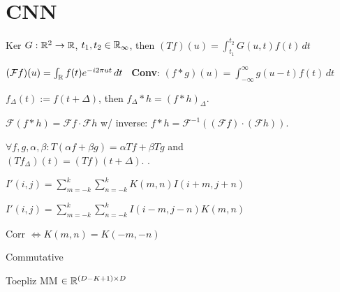 \section{CNN}

\begin{definition}[Integral Op]
    Ker \(G: \mathbb{R}^2 \to \mathbb{R}\), \(t_1, t_2 \in \mathbb{R}_\infty\), then
    \((T f)(u) = \int_{t_1}^{t_2} G(u, t) f(t) \, dt\)
\end{definition}

\begin{definition}[Fourier]
    \((\mathcal F f)(u) = \int_{\mathbb{R}} f(t) e^{-i 2 \pi u t} \, dt\) \ \textbf{Conv}:
    \((f * g)(u) = \int_{-\infty}^{\infty} g(u - t) f(t) \, dt\)
\end{definition}

\begin{definition}
    \(f_\Delta(t) := f(t + \Delta)\), then \(f_\Delta * h = (f * h)_\Delta\).
\end{definition}

\begin{theorem}[Convolution]
    \(\mathcal F(f * h) = \mathcal F f \cdot \mathcal F h\)
    w/ inverse: \(f * h = \mathcal F^{-1}((\mathcal F f) \cdot (\mathcal F h))\).
\end{theorem}

\begin{definition}
    \(\forall f, g, \alpha, \beta: T(\alpha f + \beta g) = \alpha Tf + \beta Tg\)
    and \\ \((T f_\Delta)(t) = (Tf)(t + \Delta)\). .
\end{definition}

\begin{definition}
    \(I'(i, j) = \sum_{m=-k}^k \sum_{n=-k}^k K(m, n) I(i+m, j+n)\)
\end{definition}

\begin{definition}
    \(I'(i, j) = \sum_{m=-k}^k \sum_{n=-k}^k I(i -m, j - n) K(m, n)\)

    \begin{itemize*}
        \item Corr \(\iff K(m, n) = K(-m, -n)\)
        \item Commutative
        \item Toepliz MM \(\in \mathbb{R}^{(D-K+1) \times D}\)
    \end{itemize*}
\end{definition}

